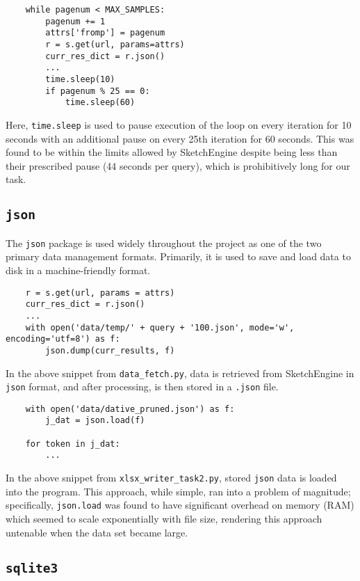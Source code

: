 \documentclass{article}      %
\begin{document}
	\begin{verbatim}
	while pagenum < MAX_SAMPLES:
		pagenum += 1
		attrs['fromp'] = pagenum
		r = s.get(url, params=attrs)
		curr_res_dict = r.json()
		...	
		time.sleep(10)
		if pagenum % 25 == 0:
			time.sleep(60)
	\end{verbatim}
	
	Here, \texttt{time.sleep} is used to pause execution of the loop on every iteration for 10 seconds with an additional pause on every 25th iteration for 60 seconds. This was found to be within the limits allowed by SketchEngine despite being less than their prescribed pause (44 seconds per query), which is prohibitively long for our task.
	
	\subsection{\texttt{json}}
	
	The \texttt{json} package is used widely throughout the project as one of the two primary data management formats. Primarily, it is used to save and load data to disk in a machine-friendly format.
	
	\begin{verbatim}
	r = s.get(url, params = attrs)
	curr_res_dict = r.json()
	...
	with open('data/temp/' + query + '100.json', mode='w', encoding='utf=8') as f:
		json.dump(curr_results, f)
	\end{verbatim}
	
	In the above snippet from \texttt{data\_fetch.py}, data is retrieved from SketchEngine in \texttt{json} format, and after processing, is then stored in a \texttt{.json} file.
	
	\begin{verbatim}
	with open('data/dative_pruned.json') as f:
		j_dat = json.load(f)
	
	for token in j_dat:
		...
	\end{verbatim}
	
	In the above snippet from \texttt{xlsx\_writer\_task2.py}, stored \texttt{json} data is loaded into the program. This approach, while simple, ran into a problem of magnitude; specifically, \texttt{json.load} was found to have significant overhead on memory (RAM) which seemed to scale exponentially with file size, rendering this approach untenable when the data set became large.
	
	\subsection{\texttt{sqlite3}}
	
\end{document}
